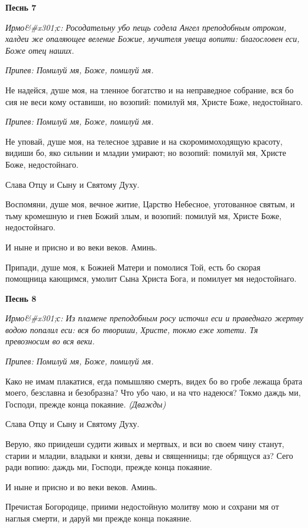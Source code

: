 \bfseries Песнь 7\normalfont{}


\itshape Ирмо&#x301;с:\normalfont{} Росодательну убо пещь содела Ангел преподобным отроком, халдеи же опаляющее веление Божие, мучителя увеща вопити: благословен еси, Боже отец наших.


\itshape Припев:\normalfont{} Помилуй мя, Боже, помилуй мя.


Не надейся, душе моя, на тленное богатство и на неправедное собрание, вся бо сия не веси кому оставиши, но возопий: помилуй мя, Христе Боже, недостойнаго.


\itshape Припев:\normalfont{} Помилуй мя, Боже, помилуй мя.


Не уповай, душе моя, на телесное здравие и на скоромимоходящую красоту, видиши бо, яко сильнии и младии умирают; но возопий: помилуй мя, Христе Боже, недостойнаго.


Слава Отцу и Сыну и Святому Духу.


Воспомяни, душе моя, вечное житие, Царство Небесное, уготованное святым, и тьму кромешную и гнев Божий злым, и возопий: помилуй мя, Христе Боже, недостойнаго.


И ныне и присно и во веки веков. Аминь.


Припади, душе моя, к Божией Матери и помолися Той, есть бо скорая помощница кающимся, умолит Сына Христа Бога, и помилует мя недостойнаго.




\bfseries Песнь 8\normalfont{}


\itshape Ирмо&#x301;с:\normalfont{} Из пламене преподобным росу источил еси и праведнаго жертву водою попалил еси: вся бо твориши, Христе, токмо еже хотети. Тя превозносим во вся веки.


\itshape Припев:\normalfont{} Помилуй мя, Боже, помилуй мя.


Како не имам плакатися, егда помышляю смерть, видех бо во гробе лежаща брата моего, безславна и безобразна? Что убо чаю, и на что надеюся? Токмо даждь ми, Господи, прежде конца покаяние. \itshape (Дважды)\normalfont{}


Слава Отцу и Сыну и Святому Духу.


Верую, яко приидеши судити живых и мертвых, и вси во своем чину станут, старии и младии, владыки и князи, девы и священницы; где обрящуся аз? Сего ради вопию: даждь ми, Господи, прежде конца покаяние.


И ныне и присно и во веки веков. Аминь.


Пречистая Богородице, приими недостойную молитву мою и сохрани мя от наглыя смерти, и даруй ми прежде конца покаяние.




